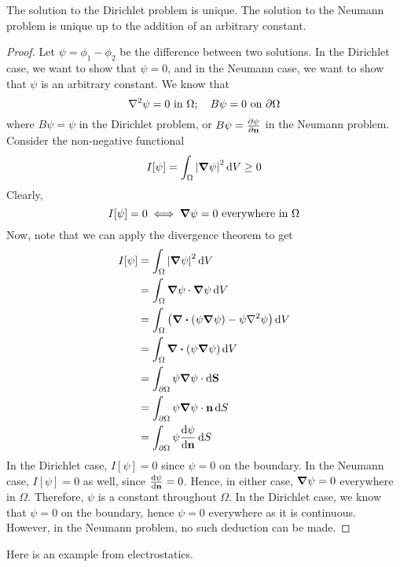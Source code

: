 \begin{proposition}
	The solution to the Dirichlet problem is unique.
	The solution to the Neumann problem is unique up to the addition of an arbitrary constant.
\end{proposition}
\begin{proof}
	Let \(\psi = \phi_1 - \phi_2\) be the difference between two solutions.
	In the Dirichlet case, we want to show that \(\psi = 0\), and in the Neumann case, we want to show that \(\psi\) is an arbitrary constant.
	We know that
	\[
		\laplacian{\psi} = 0 \text{ in } \Omega;\quad B\psi = 0 \text{ on } \partial\Omega
	\]
	where \(B\psi = \psi\) in the Dirichlet problem, or \(B\psi = \pdv{\psi}{\vb n}\) in the Neumann problem.
	Consider the non-negative functional
	\[
		I[\psi] = \int_\Omega \abs{\grad{\psi}}^2 \dd{V} \geq 0
	\]
	Clearly,
	\[
		I[\psi] = 0 \iff \grad{\psi} = 0 \text{ everywhere in } \Omega
	\]
	Now, note that we can apply the divergence theorem to get
	\begin{align*}
		I[\psi] & = \int_\Omega \abs{\grad{\psi}}^2 \dd{V}                                          \\
		        & = \int_\Omega \grad{\psi} \cdot \grad{\psi} \dd{V}                                \\
		        & = \int_\Omega \left( \div(\psi \grad{\psi}) - \psi\laplacian{\psi} \right) \dd{V} \\
		        & = \int_\Omega \div(\psi \grad{\psi}) \dd{V}                                       \\
		        & = \int_{\partial\Omega} \psi \grad{\psi} \cdot\dd{\vb S}                          \\
		        & = \int_{\partial\Omega} \psi \grad{\psi} \cdot \vb n \dd{S}                       \\
		        & = \int_{\partial\Omega} \psi \dv{\psi}{\vb n} \dd{S}                              \\
	\end{align*}
	In the Dirichlet case, \(I[\psi] = 0\) since \(\psi = 0\) on the boundary.
	In the Neumann case, \(I[\psi] = 0\) as well, since \(\dv{\psi}{\vb n} = 0\).
	Hence, in either case, \(\grad{\psi} = 0\) everywhere in \(\Omega\).
	Therefore, \(\psi\) is a constant throughout \(\Omega\).
	In the Dirichlet case, we know that \(\psi = 0\) on the boundary, hence \(\psi = 0\) everywhere as it is continuous.
	However, in the Neumann problem, no such deduction can be made.
\end{proof}
\noindent Here is an example from electrostatics.
